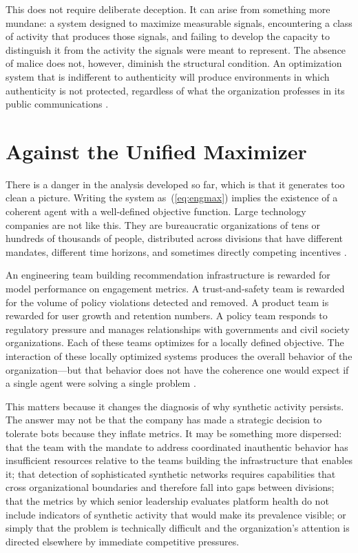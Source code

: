 \documentclass[12pt,a4paper]{article}
\begin{document}
This does not require deliberate deception. It can arise from something more mundane: a system
designed to maximize measurable signals, encountering a class of activity that produces those
signals, and failing to develop the capacity to distinguish it from the activity the signals
were meant to represent. The absence of malice does not, however, diminish the structural
condition. An optimization system that is indifferent to authenticity will produce environments
in which authenticity is not protected, regardless of what the organization professes in its
public communications \citep{gillespie2018,noble2018}.

\section{Against the Unified Maximizer}

There is a danger in the analysis developed so far, which is that it generates too clean a
picture. Writing the system as~(\ref{eq:engmax}) implies the existence of a coherent agent
with a well-defined objective function. Large technology companies are not like this. They are
bureaucratic organizations of tens or hundreds of thousands of people, distributed across
divisions that have different mandates, different time horizons, and sometimes directly
competing incentives \citep{gillespie2018}.

An engineering team building recommendation infrastructure is rewarded for model performance
on engagement metrics. A trust-and-safety team is rewarded for the volume of policy violations
detected and removed. A product team is rewarded for user growth and retention numbers. A policy
team responds to regulatory pressure and manages relationships with governments and civil society
organizations. Each of these teams optimizes for a locally defined objective. The interaction
of these locally optimized systems produces the overall behavior of the organization---but that
behavior does not have the coherence one would expect if a single agent were solving a single
problem \citep{tufekci2015}.

This matters because it changes the diagnosis of why synthetic activity persists. The answer
may not be that the company has made a strategic decision to tolerate bots because they inflate
metrics. It may be something more dispersed: that the team with the mandate to address
coordinated inauthentic behavior has insufficient resources relative to the teams building the
infrastructure that enables it; that detection of sophisticated synthetic networks requires
capabilities that cross organizational boundaries and therefore fall into gaps between divisions;
that the metrics by which senior leadership evaluates platform health do not include indicators
of synthetic activity that would make its prevalence visible; or simply that the problem is
technically difficult and the organization's attention is directed elsewhere by immediate
competitive pressures.
\end{document}
